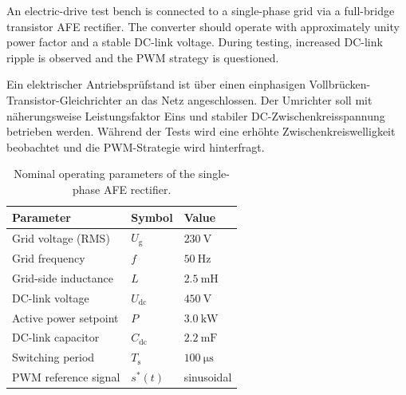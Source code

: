 

An electric-drive test bench is connected to a single-phase grid via a full-bridge transistor AFE rectifier.
The converter should operate with approximately unity power factor and a stable DC-link voltage.
During testing, increased DC-link ripple is observed and the PWM strategy is questioned.

\begin{germanblock}
	Ein elektrischer Antriebsprüfstand ist über einen einphasigen Vollbrücken-Transistor-Gleichrichter
	an das Netz angeschlossen. Der Umrichter soll mit näherungsweise Leistungsfaktor Eins und stabiler
	DC-Zwischenkreisspannung betrieben werden. Während der Tests wird eine erhöhte Zwischenkreiswelligkeit
	beobachtet und die PWM-Strategie wird hinterfragt.
\end{germanblock}


\begin{table}[ht]
	\centering
	\begin{tabular}{lll}
		\toprule
		Parameter             & Symbol          & Value                     \\
		\midrule
		Grid voltage (RMS)    & $U_\mathrm{g}$  & $\SI{230}{\volt}$         \\
		Grid frequency        & $f$             & $\SI{50}{\hertz}$         \\
		Grid-side inductance  & $L$             & $\SI{2.5}{\milli\henry}$  \\
		DC-link voltage       & $U_\mathrm{dc}$ & $\SI{450}{\volt}$         \\
		Active power setpoint & $P$             & $\SI{3.0}{\kilo\watt}$    \\
		DC-link capacitor     & $C_\mathrm{dc}$ & $\SI{2.2}{\milli\farad}$  \\
		Switching period      & $T_\mathrm{s}$  & $\SI{100}{\micro\second}$ \\
		PWM reference signal  & $s^*(t)$        & sinusoidal                \\
		\bottomrule
	\end{tabular}
	\caption{Nominal operating parameters of the single-phase AFE rectifier.}
	\label{tab:task04_parameters}
\end{table}


